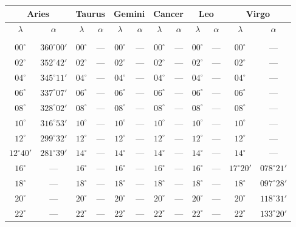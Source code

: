 \clearpage
\begin{table}[!h]
\vspace{0.25cm}
\centering
{\scriptsize\begin{tabular}{cc|cc|cc|cc|cc|cc}
\multicolumn{2}{c}{Aries}\vline & \multicolumn{2}{c}{Taurus} \vline& \multicolumn{2}{c}{Gemini} \vline& \multicolumn{2}{c}{Cancer}\vline &
\multicolumn{2}{c}{Leo}\vline & \multicolumn{2}{c}{Virgo}\\\hline
$\lambda$& $\alpha$& $\lambda$& $\alpha$& $\lambda$& $\alpha$& $\lambda$& $\alpha$& $\lambda$& $\alpha$& $\lambda$& $\alpha$\\\hline
&&&&&&&&&&&\\[-2ex]
$00^\circ$ & $360^\circ00'$ & $00^\circ$ & --- & $00^\circ$ & --- & $00^\circ$ & --- & $00^\circ$ & --- & $00^\circ$ & ---\\
$02^\circ$ & $352^\circ42'$ & $02^\circ$ & --- & $02^\circ$ & --- & $02^\circ$ & --- & $02^\circ$ & --- & $02^\circ$ & ---\\
$04^\circ$ & $345^\circ11'$ & $04^\circ$ & --- & $04^\circ$ & --- & $04^\circ$ & --- & $04^\circ$ & --- & $04^\circ$ & ---\\
$06^\circ$ & $337^\circ07'$ & $06^\circ$ & --- & $06^\circ$ & --- & $06^\circ$ & --- & $06^\circ$ & --- & $06^\circ$ & ---\\
$08^\circ$ & $328^\circ02'$ & $08^\circ$ & --- & $08^\circ$ & --- & $08^\circ$ & --- & $08^\circ$ & --- & $08^\circ$ & ---\\
$10^\circ$ & $316^\circ53'$ & $10^\circ$ & --- & $10^\circ$ & --- & $10^\circ$ & --- & $10^\circ$ & --- & $10^\circ$ & ---\\
$12^\circ$ & $299^\circ32'$ & $12^\circ$ & --- & $12^\circ$ & --- & $12^\circ$ & --- & $12^\circ$ & --- & $12^\circ$ & ---\\
$12^\circ40'$ & $281^\circ39'$& $14^\circ$ & --- & $14^\circ$ & --- & $14^\circ$ & --- & $14^\circ$ & --- & $14^\circ$ & ---\\
$16^\circ$ & --- & $16^\circ$ & --- & $16^\circ$ & --- & $16^\circ$ & --- & $16^\circ$ & --- & $17^\circ20'$ & $078^\circ21'$\\
$18^\circ$ & --- & $18^\circ$ & --- & $18^\circ$ & --- & $18^\circ$ & --- & $18^\circ$ & --- & $18^\circ$ & $097^\circ28'$\\
$20^\circ$ & --- & $20^\circ$ & --- & $20^\circ$ & --- & $20^\circ$ & --- & $20^\circ$ & --- & $20^\circ$ & $118^\circ31'$\\
$22^\circ$ & --- & $22^\circ$ & --- & $22^\circ$ & --- & $22^\circ$ & --- & $22^\circ$ & --- & $22^\circ$ & $133^\circ20'$\\

\end{tabular}}
\end{table}
